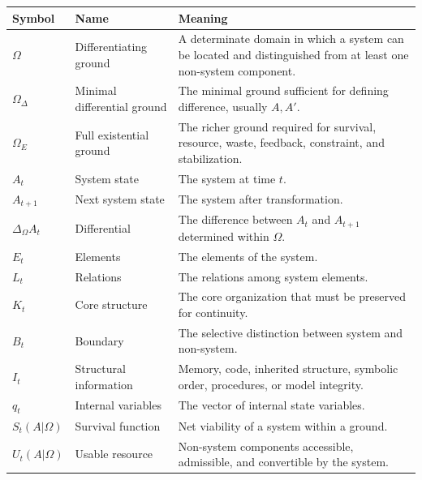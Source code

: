 \documentclass[11pt,a4paper]{article}
\begin{document}
\begin{longtable}{p{}p{}p{}}
\toprule
\textbf{Symbol} & \textbf{Name} & \textbf{Meaning} \\
\midrule
\endhead

$\Omega$ & Differentiating ground & A determinate domain in which a system can be located and distinguished from at least one non-system component. \\

$\Omega_{\Delta}$ & Minimal differential ground & The minimal ground sufficient for defining difference, usually ${A,A'}$. \\

$\Omega_E$ & Full existential ground & The richer ground required for survival, resource, waste, feedback, constraint, and stabilization. \\

$A_t$ & System state & The system at time $t$. \\

$A_{t+1}$ & Next system state & The system after transformation. \\

$\Delta_{\Omega}A_t$ & Differential & The difference between $A_t$ and $A_{t+1}$ determined within $\Omega$. \\

$E_t$ & Elements & The elements of the system. \\

$L_t$ & Relations & The relations among system elements. \\

$K_t$ & Core structure & The core organization that must be preserved for continuity. \\

$B_t$ & Boundary & The selective distinction between system and non-system. \\

$I_t$ & Structural information & Memory, code, inherited structure, symbolic order, procedures, or model integrity. \\

$q_t$ & Internal variables & The vector of internal state variables. \\

$S_t(A|\Omega)$ & Survival function & Net viability of a system within a ground. \\

$U_t(A|\Omega)$ & Usable resource & Non-system components accessible, admissible, and convertible by the system. \\


\end{longtable}
\end{document}
